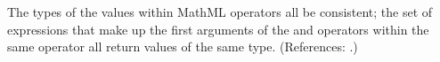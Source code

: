The types of the values within MathML  operators  all
be consistent; \ie the set of expressions that make up the first
arguments of the  and  operators within the
same  operator  all return values of the same type.
(References: .)
